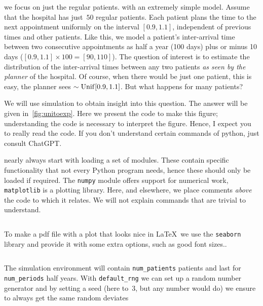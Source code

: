 \documentclass[queueing-book.tex]{subfiles}
\begin{document}
 we focus on just the regular patients. with an extremely simple model.
Assume that the hospital has just~$50$ regular patients.
Each patient plans the time to the next appointment uniformly on the interval $[0.9 , 1.1]$, independent of previous times and other patients.
Like this, we model a patient's inter-arrival time between two consecutive appointments as  half a year (100 days) plus or minus 10 days ($[0.9, 1.1] \times 100 = [90, 110]$).
The question of interest is to estimate the distribution of the inter-arrival times between any two patients \emph{as seen by the planner} of the hospital.
Of course, when there would be just one patient, this is easy, the planner sees $\sim \mathrm{Unif}[0.9, 1.1]$. But what happens for many patients?

We will use simulation to obtain insight into this question.
The answer will be given in~\cref{fig:unitoexp}.
Here we present the code to make this figure; understanding the code is necessary to interpret the figure.
Hence, I expect you to really read the code.
If you don't understand certain commands of python, just consult ChatGPT.

 nearly always start with loading a set of modules.
These contain specific functionality that not every Python program needs, hence these should only be loaded if required.
The \texttt{numpy} module offers support for numerical work, \texttt{matplotlib} is a plotting library.
Here, and elsewhere, we place comments \emph{above} the code to which it relates. We will not explain commands that are trivial to understand.

\inputminted[firstline=2, lastline=3]{python}{../code/IBD_simulations.py} %

To make a pdf file with a plot that looks nice in \LaTeX\, we  use the \texttt{seaborn} library and provide it with some extra options, such as good font sizes..
\inputminted[firstline=9, lastline=24]{python}{../code/IBD_simulations.py} %


The simulation environment will contain \texttt{num_patients} patients and last for \texttt{num_periods} half years.
With \texttt{default_rng} we can set up a random number generator and by setting a seed (here to~$3$, but any number would do)
we  ensure to always get the same random deviates
\inputminted[firstline=29, lastline=31]{python}{../code/IBD_simulations.py} %
\end{document}
